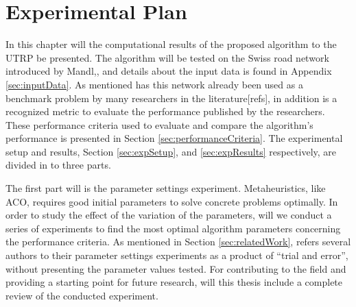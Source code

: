 \section{Experimental Plan}
\label{sec:expPlan}
In this chapter will the computational results of the proposed algorithm to the UTRP be presented. The algorithm will be tested on the Swiss road network introduced by Mandl,\citep{mandl79}, and details about the input data is found in Appendix \vref{sec:inputData}. As mentioned has this network already been used as a benchmark problem by many researchers in the literature[refs], in addition is a recognized metric to evaluate the performance published by the researchers. These performance criteria used to evaluate and compare the algorithm's performance is presented in Section \vref{sec:performanceCriteria}. The experimental setup and results, Section \vref{sec:expSetup}, and \vref{sec:expResults} respectively, are divided in to three parts. 

The first part will is the parameter settings experiment. Metaheuristics, like ACO, requires good initial parameters to solve concrete problems optimally. In order to study the effect of the variation of the parameters, will we conduct a series of experiments to find the most optimal algorithm parameters concerning the performance criteria. As mentioned in Section \vref{sec:relatedWork}, refers several authors to their parameter settings experiments as a product of ``trial and error'', without presenting the parameter values tested. For contributing to the field and providing a starting point for future research, will this thesis include a complete review of the conducted experiment.  



